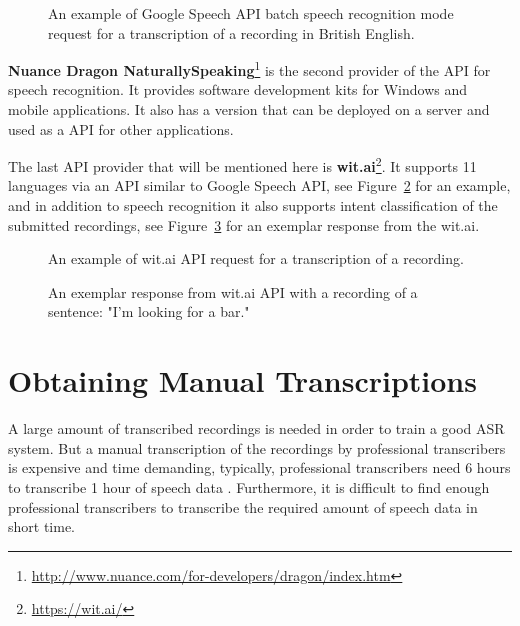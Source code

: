\begin{figure}[h]
  

  \caption{An example of Google Speech API batch speech recognition mode request for a transcription of a recording in British English.}
  \label{fig:google-api}
\end{figure}


\textbf{Nuance Dragon NaturallySpeaking}\footnote{\url{http://www.nuance.com/for-developers/dragon/index.htm}}
  is the second provider of the API for speech recognition.
It provides software development kits for Windows and mobile applications.
It also has a version that can be deployed on a server and used as a API for other applications.


The last API provider that will be mentioned here is \textbf{wit.ai}\footnote{\url{https://wit.ai/}}.
It supports 11 languages via an API similar to Google Speech API, see Figure~\ref{fig:wit-ai-request} for an example,
  and in addition to speech recognition it also supports intent classification of the submitted recordings,
  see Figure~\ref{fig:wit-ai-response} for an exemplar response from the wit.ai.

\begin{figure}[h]
  

  \caption{An example of wit.ai API request for a transcription of a recording.}
  \label{fig:wit-ai-request}
\end{figure}

\begin{figure}[h]
  

  \caption{An exemplar response from wit.ai API with a recording of a sentence: "I'm looking for a bar."}
  \label{fig:wit-ai-response}
\end{figure}


\section{Obtaining Manual Transcriptions}
A large amount of transcribed recordings is needed in order to train a good ASR system.
But a manual transcription of the recordings by professional transcribers is expensive and time demanding,
  typically, professional transcribers need 6 hours to transcribe 1 hour of speech data \cite{williams2011crowd}.
Furthermore, it is difficult to find enough professional transcribers to transcribe the required amount of speech data in short time.

